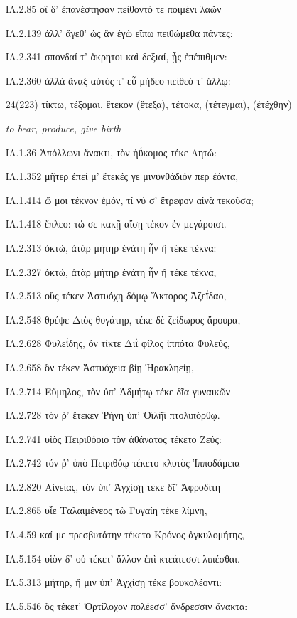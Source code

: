\begin{enumerate}
{ΙΛ.2.85 οἳ δ' ἐπανέστησαν πείθοντό τε ποιμένι λαῶν

ΙΛ.2.139 ἀλλ' ἄγεθ' ὡς ἂν ἐγὼ εἴπω πειθώμεθα πάντες:

ΙΛ.2.341 σπονδαί τ' ἄκρητοι καὶ δεξιαί, ᾗς ἐπέπιθμεν:

ΙΛ.2.360 ἀλλὰ ἄναξ αὐτός τ' εὖ μήδεο πείθεό τ' ἄλλῳ:

}

\clearpage
\item[\large 24(223)]{\large \g   τίκτω, τέξομαι, ἔτεκον (ἔτεξα), τέτοκα, (τέτεγμαι), (ἐτέχθην)    }

\hspace{0.2cm} \textit{ to bear, produce, give birth  }

{\g
ΙΛ.1.36 Ἀπόλλωνι ἄνακτι, τὸν ἠΰκομος τέκε Λητώ:

ΙΛ.1.352 μῆτερ ἐπεί μ' ἔτεκές γε μινυνθάδιόν περ ἐόντα,

ΙΛ.1.414 ὤ μοι τέκνον ἐμόν, τί νύ σ' ἔτρεφον αἰνὰ τεκοῦσα;

ΙΛ.1.418 ἔπλεο: τώ σε κακῇ αἴσῃ τέκον ἐν μεγάροισι.

ΙΛ.2.313 ὀκτώ, ἀτὰρ μήτηρ ἐνάτη ἦν ἣ τέκε τέκνα:

ΙΛ.2.327 ὀκτώ, ἀτὰρ μήτηρ ἐνάτη ἦν ἣ τέκε τέκνα,

ΙΛ.2.513 οὓς τέκεν Ἀστυόχη δόμῳ Ἄκτορος Ἀζεΐδαο,

ΙΛ.2.548 θρέψε Διὸς θυγάτηρ, τέκε δὲ ζείδωρος ἄρουρα,

ΙΛ.2.628 Φυλεΐδης, ὃν τίκτε Διῒ φίλος ἱππότα Φυλεύς,

ΙΛ.2.658 ὃν τέκεν Ἀστυόχεια βίῃ Ἡρακληείῃ,

ΙΛ.2.714 Εὔμηλος, τὸν ὑπ' Ἀδμήτῳ τέκε δῖα γυναικῶν

ΙΛ.2.728 τόν ῥ' ἔτεκεν Ῥήνη ὑπ' Ὀϊλῆϊ πτολιπόρθῳ.

ΙΛ.2.741 υἱὸς Πειριθόοιο τὸν ἀθάνατος τέκετο Ζεύς:

ΙΛ.2.742 τόν ῥ' ὑπὸ Πειριθόῳ τέκετο κλυτὸς Ἱπποδάμεια

ΙΛ.2.820 Αἰνείας, τὸν ὑπ' Ἀγχίσῃ τέκε δῖ' Ἀφροδίτη

ΙΛ.2.865 υἷε Ταλαιμένεος τὼ Γυγαίη τέκε λίμνη,

ΙΛ.4.59 καί με πρεσβυτάτην τέκετο Κρόνος ἀγκυλομήτης,

ΙΛ.5.154 υἱὸν δ' οὐ τέκετ' ἄλλον ἐπὶ κτεάτεσσι λιπέσθαι.

ΙΛ.5.313 μήτηρ, ἥ μιν ὑπ' Ἀγχίσῃ τέκε βουκολέοντι:

ΙΛ.5.546 ὃς τέκετ' Ὀρτίλοχον πολέεσσ' ἄνδρεσσιν ἄνακτα:
}



\end{enumerate}
